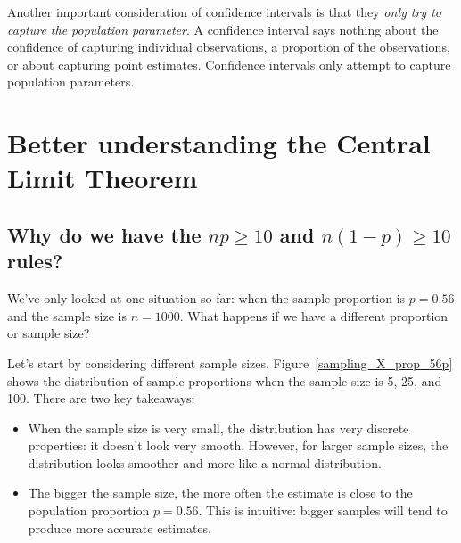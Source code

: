 Another important consideration of confidence intervals is that they
\emph{only try to capture the population parameter}. A confidence
interval says nothing about the confidence of capturing individual
observations, a proportion of the observations, or about capturing
point estimates. Confidence intervals only attempt to capture
population parameters.

























\section{Better understanding the Central Limit Theorem}


\subsection{Why do we have the $np \geq 10$ and
    $n(1-p) \geq 10$ rules?}

We've only looked at one situation so far: when the sample
proportion is $p = 0.56$ and the sample size is $n = 1000$.
What happens if we have a different proportion or sample size?

Let's start by considering different sample sizes.
Figure~\ref{sampling_X_prop_56p} shows the distribution of sample
proportions when the sample size is 5, 25, and 100. There are
two key takeaways:
\begin{itemize}
\item When the sample size is very small, the distribution has
very discrete properties: it doesn't look very smooth. However,
for larger sample sizes, the distribution looks smoother and
more like a normal distribution.
\item The bigger the sample size, the more often the estimate is
close to the population proportion $p = 0.56$. This is intuitive:
bigger samples will tend to produce more accurate estimates.
\end{itemize}

